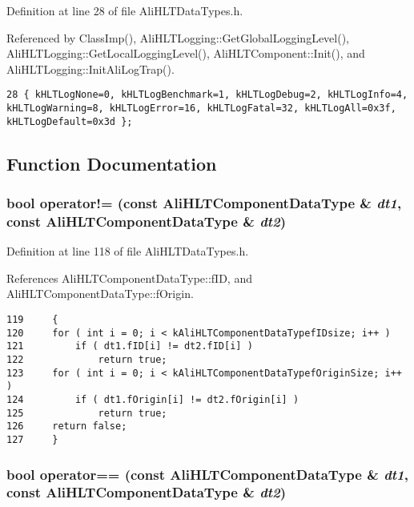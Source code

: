Definition at line 28 of file Ali\-HLTData\-Types.h.

Referenced by Class\-Imp(), Ali\-HLTLogging::Get\-Global\-Logging\-Level(), Ali\-HLTLogging::Get\-Local\-Logging\-Level(), Ali\-HLTComponent::Init(), and Ali\-HLTLogging::Init\-Ali\-Log\-Trap().

\footnotesize\begin{verbatim}28 { kHLTLogNone=0, kHLTLogBenchmark=1, kHLTLogDebug=2, kHLTLogInfo=4, kHLTLogWarning=8, kHLTLogError=16, kHLTLogFatal=32, kHLTLogAll=0x3f, kHLTLogDefault=0x3d };
\end{verbatim}\normalsize 




\subsection{Function Documentation}
\subsubsection{\setlength{\rightskip}{0pt plus 5cm}bool operator!= (const {\bf Ali\-HLTComponent\-Data\-Type} \& {\em dt1}, const {\bf Ali\-HLTComponent\-Data\-Type} \& {\em dt2})\hspace{0.3cm}{\tt  [inline]}}\label{AliHLTDataTypes_8h_a28}




Definition at line 118 of file Ali\-HLTData\-Types.h.

References Ali\-HLTComponent\-Data\-Type::f\-ID, and Ali\-HLTComponent\-Data\-Type::f\-Origin.

\footnotesize\begin{verbatim}119     {
120     for ( int i = 0; i < kAliHLTComponentDataTypefIDsize; i++ )
121         if ( dt1.fID[i] != dt2.fID[i] )
122             return true;
123     for ( int i = 0; i < kAliHLTComponentDataTypefOriginSize; i++ )
124         if ( dt1.fOrigin[i] != dt2.fOrigin[i] )
125             return true;
126     return false;
127     }
\end{verbatim}\normalsize 


\subsubsection{\setlength{\rightskip}{0pt plus 5cm}bool operator== (const {\bf Ali\-HLTComponent\-Data\-Type} \& {\em dt1}, const {\bf Ali\-HLTComponent\-Data\-Type} \& {\em dt2})\hspace{0.3cm}{\tt  [inline]}}\label{AliHLTDataTypes_8h_a27}




